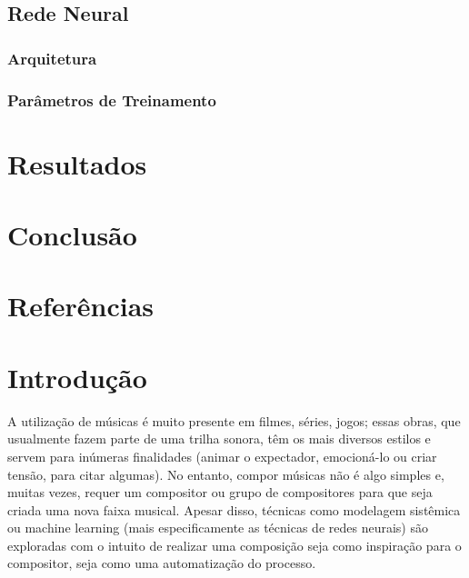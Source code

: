 \documentclass{automatextcc}
\begin{document}
\section{Rede Neural}
\subsection{Arquitetura}
\subsection{Parâmetros de Treinamento}

\chapter{Resultados}

\chapter{Conclusão}

\chapter{Referências}





\chapter{Introdução}

A utilização de músicas é muito presente em filmes, séries, jogos; essas obras, que usualmente fazem parte de uma trilha sonora, têm os mais diversos estilos e servem para inúmeras finalidades (animar o expectador, emocioná-lo ou criar tensão, para citar algumas). No entanto, compor músicas não é algo simples e, muitas vezes, requer um compositor ou grupo de compositores para que seja criada uma nova faixa musical. Apesar disso, técnicas como modelagem sistêmica \citep[veja][]{da2017modelagem} ou machine learning (mais especificamente as técnicas de redes neurais) são exploradas com o intuito de realizar uma composição \citep[ver em][]{agarwala2017music} seja como inspiração para o compositor, seja como uma automatização do processo.
\end{document}

